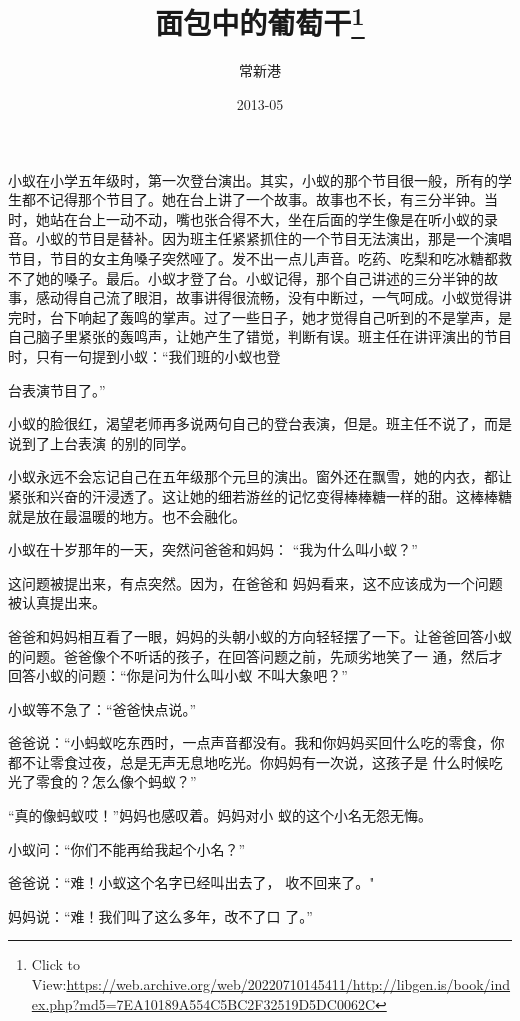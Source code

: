 \documentclass{article}
\title{面包中的葡萄干\footnote{Click to View:\url{https://web.archive.org/web/20220710145411/http://libgen.is/book/index.php?md5=7EA10189A554C5BC2F32519D5DC0062C}}}
\author{常新港}
\date{2013-05}
\begin{document}

\maketitle


\Large

﻿小蚁在小学五年级时，第一次登台演出。其实，小蚁的那个节目很一般，所有的学生都不记得那个节目了。她在台上讲了一个故事。故事也不长，有三分半钟。当时，她站在台上一动不动，嘴也张合得不大，坐在后面的学生像是在听小蚁的录音。小蚁的节目是替补。因为班主任紧紧抓住的一个节目无法演出，那是一个演唱节目，节目的女主角嗓子突然哑了。发不出一点儿声音。吃药、吃梨和吃冰糖都救不了她的嗓子。最后。小蚁才登了台。小蚁记得，那个自己讲述的三分半钟的故事，感动得自己流了眼泪，故事讲得很流畅，没有中断过，一气呵成。小蚁觉得讲完时，台下响起了轰鸣的掌声。过了一些日子，她才觉得自己听到的不是掌声，是自己脑子里紧张的轰鸣声，让她产生了错觉，判断有误。班主任在讲评演出的节目时，只有一句提到小蚁：“我们班的小蚁也登
\newpage

台表演节目了。” 

小蚁的脸很红，渴望老师再多说两句自己的登台表演，但是。班主任不说了，而是说到了上台表演
的别的同学。 

小蚁永远不会忘记自己在五年级那个元旦的演出。窗外还在飘雪，她的内衣，都让紧张和兴奋的汗浸透了。这让她的细若游丝的记忆变得棒棒糖一样的甜。这棒棒糖就是放在最温暖的地方。也不会融化。
 

小蚁在十岁那年的一天，突然问爸爸和妈妈：
“我为什么叫小蚁？” 

这问题被提出来，有点突然。因为，在爸爸和
妈妈看来，这不应该成为一个问题被认真提出来。 

爸爸和妈妈相互看了一眼，妈妈的头朝小蚁的方向轻轻摆了一下。让爸爸回答小蚁的问题。爸爸像个不听话的孩子，在回答问题之前，先顽劣地笑了一
\newpage
通，然后才回答小蚁的问题：“你是问为什么叫小蚁
不叫大象吧？” 


小蚁等不急了：“爸爸快点说。” 

爸爸说：“小蚂蚁吃东西时，一点声音都没有。我和你妈妈买回什么吃的零食，你都不让零食过夜，总是无声无息地吃光。你妈妈有一次说，这孩子是
什么时候吃光了零食的？怎么像个蚂蚁？” 

“真的像蚂蚁哎！”妈妈也感叹着。妈妈对小
蚁的这个小名无怨无悔。 


小蚁问：“你们不能再给我起个小名？” 

爸爸说：“难！小蚁这个名字已经叫出去了，
收不回来了。" 

妈妈说：“难！我们叫了这么多年，改不了口
了。” 

\newpage
\end{document}
